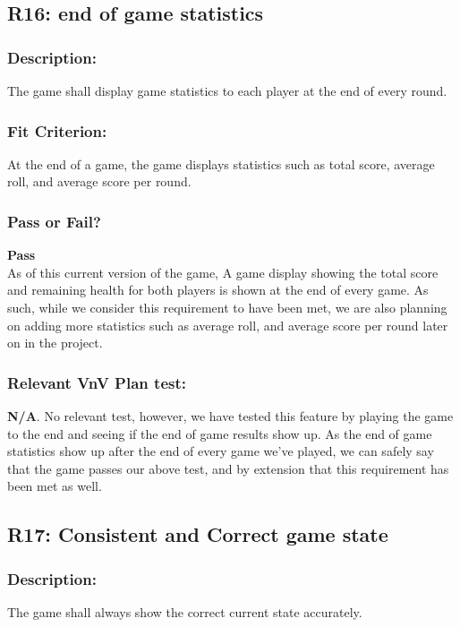 \documentclass[12pt, titlepage]{article}
\begin{document}
\subsection{R16: end of game statistics} 

\subsubsection{Description:}The game shall display game statistics to each player at the end of every round.

\subsubsection{Fit Criterion:}At the end of a game, the game displays statistics such as total score, average roll, and average score per round.

\subsubsection{Pass or Fail?} 

 \noindent \textbf{Pass}\\
 
 \noindent As of this current version of the game, A game display showing the total score and remaining health for both players is shown at the end of every game. As such, while we consider this requirement to have been met, we are also planning on adding more statistics such as average roll, and average score per round later on in the project.
 
 \subsubsection{Relevant VnV Plan test: } \textbf{N/A}. No relevant test, however, we have tested this feature by playing the game to the end and seeing if the end of game results show up. As the end of game statistics show up after the end of every game we've played, we can safely say that the game passes our above test, and by extension that this requirement has been met as well.

\subsection{R17: Consistent and Correct game state} 

\subsubsection{Description:} The game shall always show the correct current state accurately.
\end{document}
